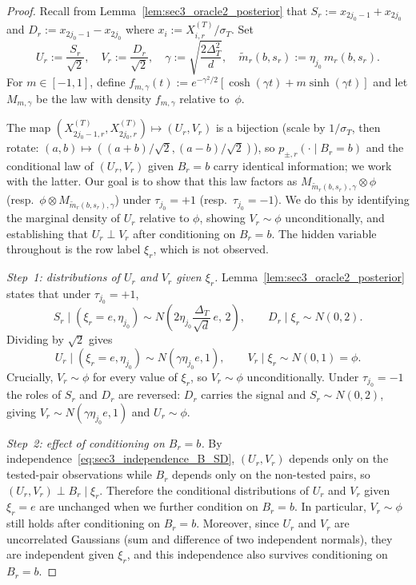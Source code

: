 \documentclass[10pt]{article}
\newcommand{\trg}{T}
\newcommand{\sigmaT}{\sigma_{\trg}}
\newcommand{\DeltaT}{\Delta_{\trg}}
\begin{document}
\begin{proof}
Recall from Lemma~\ref{lem:sec3_oracle2_posterior} that
$S_r:=x_{2j_0-1}+x_{2j_0}$ and $D_r:=x_{2j_0-1}-x_{2j_0}$ where
$x_i:=X^{(T)}_{i,r}/\sigmaT$. Set
\[
    U_r:=\frac{S_r}{\sqrt2},\quad
    V_r:=\frac{D_r}{\sqrt2},\quad
    \gamma:=\sqrt{\frac{2\DeltaT^2}{d}},\quad
    \widetilde m_r(b,s_r):=\eta_{j_0}\,m_r(b,s_r).
\]
For $m\in[-1,1]$, define
$f_{m,\gamma}(t):=e^{-\gamma^2/2}[\cosh(\gamma t)+m\sinh(\gamma t)]$
and let $M_{m,\gamma}$ be the law with density $f_{m,\gamma}$ relative to~$\phi$.

The map $(X^{(T)}_{2j_0-1,r},X^{(T)}_{2j_0,r})\mapsto(U_r,V_r)$ is a bijection
(scale by $1/\sigmaT$, then rotate: $(a,b)\mapsto((a+b)/\sqrt2,(a-b)/\sqrt2)$),
so $p_{\pm,r}(\cdot\mid B_r=b)$ and the conditional law of $(U_r,V_r)$ given
$B_r=b$ carry identical information; we work with the latter. Our goal is to show that this
law factors as $M_{\widetilde m_r(b,s_r),\gamma}\otimes\phi$ (resp.\
$\phi\otimes M_{\widetilde m_r(b,s_r),\gamma}$) under $\tau_{j_0}=+1$
(resp.\ $\tau_{j_0}=-1$). We do this by identifying the marginal density of $U_r$
relative to $\phi$, showing $V_r\sim\phi$ unconditionally, and establishing
that $U_r\perp V_r$ after conditioning on $B_r=b$. The hidden variable
throughout is the row label $\xi_r$, which is not observed.

\medskip
\noindent\textit{Step~1: distributions of $U_r$ and $V_r$ given $\xi_r$.}
Lemma~\ref{lem:sec3_oracle2_posterior} states that under $\tau_{j_0}=+1$,
\[
    S_r\mid(\xi_r=e,\eta_{j_0})\sim N\!\left(2\eta_{j_0}\frac{\DeltaT}{\sqrt d}\,e,\,2\right),
    \qquad
    D_r\mid\xi_r\sim N(0,2).
\]
Dividing by $\sqrt2$ gives
\[
    U_r\mid(\xi_r=e,\eta_{j_0})\sim N(\gamma\eta_{j_0} e,1),
    \qquad
    V_r\mid\xi_r\sim N(0,1)=\phi.
\]
Crucially, $V_r\sim\phi$ for every value of $\xi_r$, so $V_r\sim\phi$
unconditionally. Under $\tau_{j_0}=-1$ the roles of $S_r$ and $D_r$ are reversed:
$D_r$ carries the signal and $S_r\sim N(0,2)$, giving $V_r\sim N(\gamma\eta_{j_0} e,1)$
and $U_r\sim\phi$.

\medskip
\noindent\textit{Step~2: effect of conditioning on $B_r=b$.}
By independence~\eqref{eq:sec3_independence_B_SD}, $(U_r,V_r)$ depends only
on the tested-pair observations while $B_r$ depends only on the non-tested
pairs, so $(U_r,V_r)\perp B_r\mid\xi_r$. Therefore the conditional distributions
of $U_r$ and $V_r$ given $\xi_r=e$ are unchanged when we further condition on
$B_r=b$. In particular, $V_r\sim\phi$ still holds after conditioning on $B_r=b$.
Moreover, since $U_r$ and $V_r$ are uncorrelated Gaussians (sum and difference
of two independent normals), they are independent given $\xi_r$, and this
independence also survives conditioning on $B_r=b$.


\end{proof}
\end{document}
